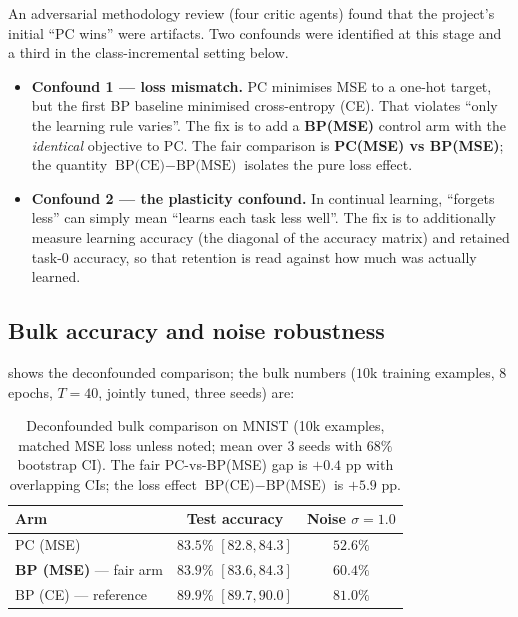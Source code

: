 An adversarial methodology review (four critic agents) found that the project's initial
``PC wins'' were artifacts. Two confounds were identified at this stage and a third in the
class-incremental setting below.
\begin{itemize}
  \item \textbf{Confound 1 --- loss mismatch.} PC minimises MSE to a one-hot target, but the first
  BP baseline minimised cross-entropy (CE). That violates ``only the learning rule varies''. The
  fix is to add a \textbf{BP(MSE)} control arm with the \emph{identical} objective to PC. The fair
  comparison is \textbf{PC(MSE) vs BP(MSE)}; the quantity \(\text{BP(CE)}-\text{BP(MSE)}\) isolates
  the pure loss effect.
  \item \textbf{Confound 2 --- the plasticity confound.} In continual learning, ``forgets less''
  can simply mean ``learns each task less well''. The fix is to additionally measure learning
  accuracy (the diagonal of the accuracy matrix) and retained task-0 accuracy, so that retention
  is read against how much was actually learned.
\end{itemize}

\subsection{Bulk accuracy and noise robustness}

 shows the deconfounded comparison; the bulk numbers (\(10\)k training
examples, \(8\) epochs, \(T=40\), jointly tuned, three seeds) are:

\begin{table}[t]
  \centering
  \caption{Deconfounded bulk comparison on MNIST (10k examples, matched MSE loss unless noted;
  mean over 3 seeds with \(68\%\) bootstrap CI). The fair PC-vs-BP(MSE) gap is \(+0.4\) pp with
  overlapping CIs; the loss effect \(\text{BP(CE)}-\text{BP(MSE)}\) is \(+5.9\) pp.}
  \label{tab:bulk}
  \begin{tabular}{lcc}
    \toprule
    Arm & Test accuracy & Noise \(\sigma=1.0\) \\
    \midrule
    PC (MSE)                         & \(83.5\%\) \([82.8, 84.3]\) & \(52.6\%\) \\
    \textbf{BP (MSE)} --- fair arm   & \(83.9\%\) \([83.6, 84.3]\) & \(60.4\%\) \\
    BP (CE) --- reference            & \(89.9\%\) \([89.7, 90.0]\) & \(81.0\%\) \\
    \bottomrule
  \end{tabular}
\end{table}

